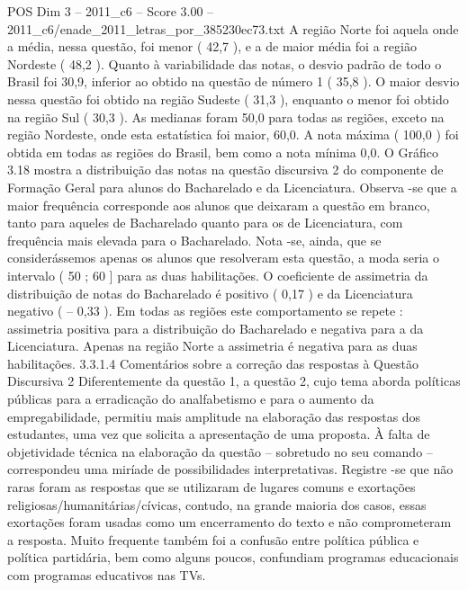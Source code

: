 \begin{textsample}{POS Dim 3 – 2011\_c6 – Score 3.00 – 2011\_c6/enade\_2011\_letras\_por\_385230ec73.txt}
A região Norte foi aquela onde a média, nessa questão, foi menor ( 42,7 ), e a de maior média foi a região Nordeste ( 48,2 ).
Quanto à variabilidade das notas, o desvio padrão de todo o Brasil foi 30,9, inferior ao obtido na questão de número 1 ( 35,8 ).
O maior desvio nessa questão foi obtido na região Sudeste ( 31,3 ), enquanto o menor foi obtido na região Sul ( 30,3 ).
As medianas foram 50,0 para todas as regiões, exceto na região Nordeste, onde esta estatística foi maior, 60,0.
A nota máxima ( 100,0 ) foi obtida em todas as regiões do Brasil, bem como a nota mínima 0,0.
O Gráfico 3.18 mostra a distribuição das notas na questão discursiva 2 do componente de Formação Geral para alunos do Bacharelado e da Licenciatura.
Observa -se que a maior frequência corresponde aos alunos que deixaram a questão em branco, tanto para aqueles de Bacharelado quanto para os de Licenciatura, com frequência mais elevada para o Bacharelado.
Nota -se, ainda, que se considerássemos apenas os alunos que resolveram esta questão, a moda seria o intervalo ( 50 ; 60 ] para as duas habilitações.
O coeficiente de assimetria da distribuição de notas do Bacharelado é positivo ( 0,17 ) e da Licenciatura negativo ( – 0,33 ).
Em todas as regiões este comportamento se repete : assimetria positiva para a distribuição do Bacharelado e negativa para a da Licenciatura.
Apenas na região Norte a assimetria é negativa para as duas habilitações. 3.3.1.4 Comentários sobre a correção das respostas à Questão Discursiva 2 Diferentemente da questão 1, a questão 2, cujo tema aborda políticas públicas para a erradicação do analfabetismo e para o aumento da empregabilidade, permitiu mais amplitude na elaboração das respostas dos estudantes, uma vez que solicita a apresentação de uma proposta.
À falta de objetividade técnica na elaboração da questão – sobretudo no seu comando – correspondeu uma miríade de possibilidades interpretativas.
Registre -se que não raras foram as respostas que se utilizaram de lugares comuns e exortações religiosas/humanitárias/cívicas, contudo, na grande maioria dos casos, essas exortações foram usadas como um encerramento do texto e não comprometeram a resposta.
Muito frequente também foi a confusão entre política pública e política partidária, bem como alguns poucos, confundiam programas educacionais com programas educativos nas TVs.

\end{textsample}
